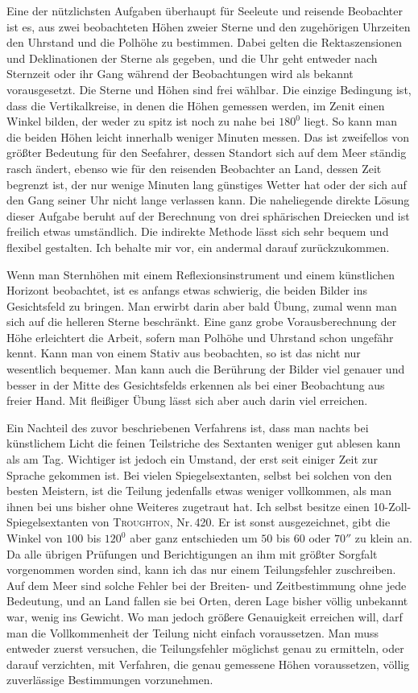 Eine der nützlichsten Aufgaben überhaupt für Seeleute und reisende Beobachter ist es, aus zwei beobachteten Höhen zweier Sterne und den zugehörigen Uhrzeiten den Uhrstand und die Polhöhe zu bestimmen. Dabei gelten die Rektaszensionen und Deklinationen der Sterne als gegeben, und die Uhr geht entweder nach Sternzeit oder ihr Gang während der Beobachtungen wird als bekannt vorausgesetzt. Die Sterne und Höhen sind frei wählbar. Die einzige Bedingung ist, dass die Vertikalkreise, in denen die Höhen gemessen werden, im Zenit einen Winkel bilden, der weder zu spitz ist noch zu nahe bei $180^0$ liegt. So kann man die beiden Höhen leicht innerhalb weniger Minuten messen. Das ist zweifellos von größter Bedeutung für den Seefahrer, dessen Standort sich auf dem Meer ständig rasch ändert, ebenso wie für den reisenden Beobachter an Land, dessen Zeit begrenzt ist, der nur wenige Minuten lang günstiges Wetter hat oder der sich auf den Gang seiner Uhr nicht lange verlassen kann. Die naheliegende direkte Lösung dieser Aufgabe beruht auf der Berechnung von drei sphärischen Dreiecken und ist freilich etwas umständlich. Die indirekte Methode lässt sich sehr bequem und flexibel gestalten. Ich behalte mir vor, ein andermal darauf zurückzukommen.

Wenn man Sternhöhen mit einem Reflexionsinstrument und einem künstlichen Horizont beobachtet, ist es anfangs etwas schwierig, die beiden Bilder ins Gesichtsfeld zu bringen. Man erwirbt darin aber bald Übung, zumal wenn man sich auf die helleren Sterne beschränkt. Eine ganz grobe Vorausberechnung der Höhe erleichtert die Arbeit, sofern man Polhöhe und Uhrstand schon ungefähr kennt. Kann man von einem Stativ aus beobachten,
%
so ist das nicht nur wesentlich bequemer. Man kann auch die Berührung der Bilder viel genauer und besser in der Mitte des Gesichtsfelds erkennen als bei einer Beobachtung aus freier Hand. Mit fleißiger Übung lässt sich aber auch darin viel erreichen.

Ein Nachteil des zuvor beschriebenen Verfahrens ist, dass man nachts bei künstlichem Licht die feinen Teilstriche des Sextanten weniger gut ablesen kann als am Tag. Wichtiger ist jedoch ein Umstand, der erst seit einiger Zeit zur Sprache gekommen ist. Bei vielen Spiegelsextanten, selbst bei solchen von den besten Meistern, ist die Teilung jedenfalls etwas weniger vollkommen, als man ihnen bei uns bisher ohne Weiteres zugetraut hat. Ich selbst besitze einen 10-Zoll-Spiegelsextanten von \textsc{Troughton}, Nr.\,420. Er ist sonst ausgezeichnet, gibt die Winkel von $100$ bis $120^0$ aber ganz entschieden um $50$ bis $60$ oder $70''$ zu klein an. Da alle übrigen Prüfungen und Berichtigungen an ihm mit größter Sorgfalt vorgenommen worden sind, kann ich das nur einem Teilungsfehler zuschreiben. Auf dem Meer sind solche Fehler bei der Breiten- und Zeitbestimmung ohne jede Bedeutung, und an Land fallen sie bei Orten, deren Lage bisher völlig unbekannt war, wenig ins Gewicht. Wo man jedoch größere Genauigkeit erreichen will, darf man die Vollkommenheit der Teilung nicht einfach voraussetzen. Man muss entweder zuerst versuchen, die Teilungsfehler möglichst genau zu ermitteln, oder darauf verzichten, mit Verfahren, die genau gemessene Höhen voraussetzen, völlig zuverlässige Bestimmungen vorzunehmen.


